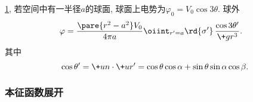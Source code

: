 \documentclass[hidelinks]{ctexart}
\begin{document}
\begin{figure}[ht]
    \centering
    \caption{}
    \label{fig:球面green}
\end{figure}
\begin{sample}
    \begin{ex}
        \cref{fig:球面green}, 若空间中有一半径$a$的球面, 球面上电势为$\varphi_0 = V_0\cos 3\theta$. 球外
        \begin{align*}
            & \varphi = \frac{\pare{r^2 - a^2}V_0}{4\pi a}\oiint_{r'=a}\rd{\sigma'}\, \frac{\cos 3\theta'}{\+gr^3}.
        \end{align*}
        其中
        \[ \cos\theta' = \+un\cdot \+ur' = \cos\theta\cos\alpha + \sin\theta\sin\alpha\cos\beta. \]
    \end{ex}
\end{sample}


\subsubsection{本征函数展开} %
\label{ssub:本征函数展开}
\end{document}

